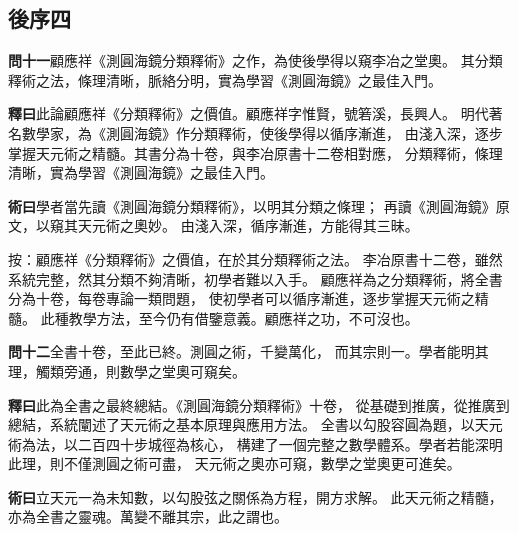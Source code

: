 \documentclass[12pt,a4paper]{article}
\newcommand{\Section}[1]{\subsection*{#1}}
\begin{document}
\Section{後序四}

\noindent\textbf{問十一}\quad 顧應祥《測圓海鏡分類釋術》之作，為使後學得以窺李冶之堂奧。
其分類釋術之法，條理清晰，脈絡分明，實為學習《測圓海鏡》之最佳入門。

\vspace{0.3em}

\noindent\textbf{釋曰}\quad 此論顧應祥《分類釋術》之價值。顧應祥字惟賢，號箬溪，長興人。
明代著名數學家，為《測圓海鏡》作分類釋術，使後學得以循序漸進，
由淺入深，逐步掌握天元術之精髓。其書分為十卷，與李冶原書十二卷相對應，
分類釋術，條理清晰，實為學習《測圓海鏡》之最佳入門。

\vspace{0.3em}

\noindent\textbf{術曰}\quad 學者當先讀《測圓海鏡分類釋術》，以明其分類之條理；
再讀《測圓海鏡》原文，以窺其天元術之奧妙。
由淺入深，循序漸進，方能得其三昧。

\vspace{0.3em}

\noindent
按：顧應祥《分類釋術》之價值，在於其分類釋術之法。
李冶原書十二卷，雖然系統完整，然其分類不夠清晰，初學者難以入手。
顧應祥為之分類釋術，將全書分為十卷，每卷專論一類問題，
使初學者可以循序漸進，逐步掌握天元術之精髓。
此種教學方法，至今仍有借鑒意義。顧應祥之功，不可沒也。

\vspace{0.5em}

\noindent\textbf{問十二}\quad 全書十卷，至此已終。測圓之術，千變萬化，
而其宗則一。學者能明其理，觸類旁通，則數學之堂奧可窺矣。

\vspace{0.3em}

\noindent\textbf{釋曰}\quad 此為全書之最終總結。《測圓海鏡分類釋術》十卷，
從基礎到推廣，從推廣到總結，系統闡述了天元術之基本原理與應用方法。
全書以勾股容圓為題，以天元術為法，以二百四十步城徑為核心，
構建了一個完整之數學體系。學者若能深明此理，則不僅測圓之術可盡，
天元術之奧亦可窺，數學之堂奧更可進矣。

\vspace{0.3em}

\noindent\textbf{術曰}\quad 立天元一為未知數，以勾股弦之關係為方程，開方求解。
此天元術之精髓，亦為全書之靈魂。萬變不離其宗，此之謂也。

\vspace{0.3em}
\end{document}
